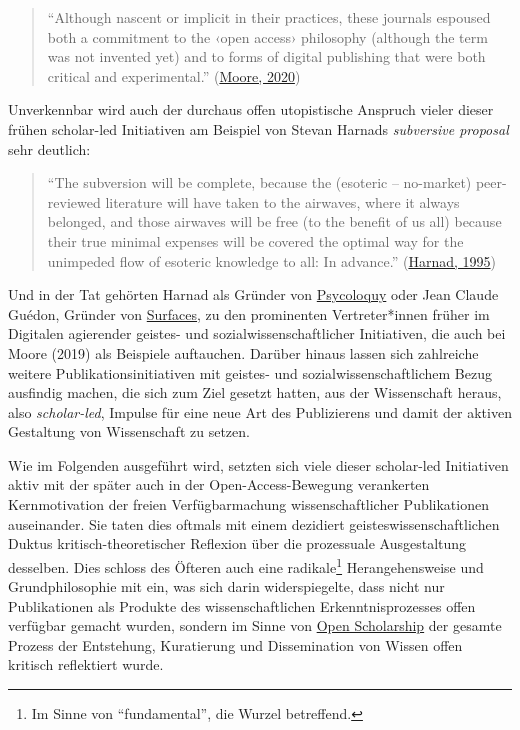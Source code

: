 \documentclass[a4paper,
fontsize=11pt,
oneside,
numbers=noperiodatend,
parskip=half-,
bibliography=totoc,
final
]{scrartcl}
\begin{document}
\begin{quote}
\enquote{Although nascent or implicit in their practices, these journals
espoused both a commitment to the ‹open access› philosophy (although the
term was not invented yet) and to forms of digital publishing that were
both critical and experimental.}
(\href{http://dx.doi.org/10.17613/gty2-w177}{Moore, 2020})
\end{quote}

Unverkennbar wird auch der durchaus offen utopistische Anspruch vieler
dieser frühen scholar-led Initiativen am Beispiel von Stevan Harnads
\emph{subversive proposal} sehr deutlich:

\begin{quote}
\enquote{The subversion will be complete, because the (esoteric --
no-market) peer-reviewed literature will have taken to the airwaves,
where it always belonged, and those airwaves will be free (to the
benefit of us all) because their true minimal expenses will be covered
the optimal way for the unimpeded flow of esoteric knowledge to all: In
advance.} (\href{https://eprints.soton.ac.uk/362894/}{Harnad, 1995})
\end{quote}

Und in der Tat gehörten Harnad als Gründer von
\href{https://web-archive.southampton.ac.uk/journals.ecs.soton.ac.uk/CogsciDemo/psyc\_hp.html}{Psycoloquy}
oder Jean Claude Guédon, Gründer von
\href{https://www.erudit.org/en/journals/surfaces/}{Surfaces}, zu den
prominenten Vertreter*innen früher im Digitalen agierender geistes- und
sozialwissenschaftlicher Initiativen, die auch bei Moore (2019) als
Beispiele auftauchen. Darüber hinaus lassen sich zahlreiche weitere
Publikationsinitiativen mit geistes- und sozialwissenschaftlichem Bezug
ausfindig machen, die sich zum Ziel gesetzt hatten, aus der Wissenschaft
heraus, also \emph{scholar-led}, Impulse für eine neue Art des
Publizierens und damit der aktiven Gestaltung von Wissenschaft zu
setzen.

Wie im Folgenden ausgeführt wird, setzten sich viele dieser scholar-led
Initiativen aktiv mit der später auch in der Open-Access-Bewegung
verankerten Kernmotivation der freien Verfügbarmachung
wissenschaftlicher Publikationen auseinander. Sie taten dies oftmals mit
einem dezidiert geisteswissenschaftlichen Duktus kritisch-theoretischer
Reflexion über die prozessuale Ausgestaltung desselben. Dies schloss des
Öfteren auch eine radikale\footnote{Im Sinne von \enquote{fundamental},
  die Wurzel betreffend.} Herangehensweise und Grundphilosophie mit ein,
was sich darin widerspiegelte, dass nicht nur Publikationen als Produkte
des wissenschaftlichen Erkenntnisprozesses offen verfügbar gemacht
wurden, sondern im Sinne von
\href{https://library.nuigalway.ie/openscholarship/}{Open Scholarship}
der gesamte Prozess der Entstehung, Kuratierung und Dissemination von
Wissen offen kritisch reflektiert wurde.
\end{document}
